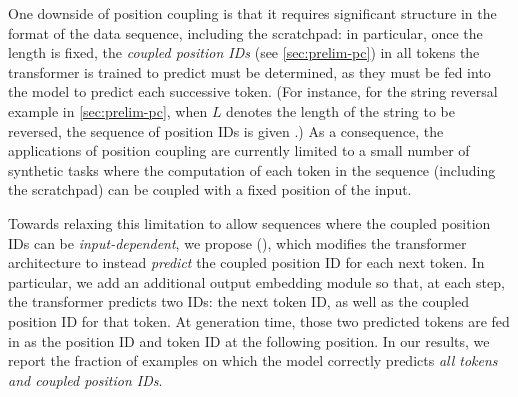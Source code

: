 \documentclass{article}
\newcommand{\arxiv}[1]{\iftoggle{icml}{}{#1}}
\newcommand{\icml}[1]{\iftoggle{icml}{#1}{}}
\begin{document}
One downside of position coupling is that it requires significant structure in the format of the data sequence, including the scratchpad: in particular, once the length is fixed, the \emph{coupled position IDs} (see \cref{sec:prelim-pc}) in all tokens the transformer is trained to predict  must be determined, as they must be fed into the model to predict each successive token. (For instance, for the string reversal example in \cref{sec:prelim-pc}, when $L$ denotes the length of the string to be reversed, the sequence of position IDs is given \arxiv{by \cref{eq:string-reversal-posids}}\icml{as in \cref{sec:prelim-pc}}.) %
As a consequence, the applications of position coupling are currently limited to a small number of synthetic tasks where the computation of each token in the sequence (including the scratchpad) can be coupled with a fixed position of the input.

Towards relaxing this limitation to allow sequences where the coupled position IDs can be \emph{input-dependent}, we propose \emph{\predpc} (\PPC), which modifies the transformer architecture to instead \emph{predict} the coupled position ID for each next token. In particular, we add an additional output embedding module so that, at each step, the transformer predicts two IDs: the next token ID, as well as the coupled position ID for that token. At generation time, those two predicted tokens are fed in as the position ID and token ID at the following position. 
In our results, we report the fraction of examples on which the model correctly predicts \emph{all tokens and coupled position IDs}. %


\arxiv{\paragraph{Experimental goals.} In the experiments discussed below, we aim to: (a) show that \predpc can successfully be applied to improve length generalization on instances where position IDs in the scratchpad must be predicted; and (b) validate our theoretical takeaways emphasizing the importance of \emph{sparsity} \ref{it:ta-sparsity} and \emph{locality}  \ref{it:ta-locality} in controlling length \generalization for instances with a scratchpad. Towards the latter goal, %
we will evaluate the impact of (i) removing position coupling, which as discussed in \cref{sec:theory-pc} corresponds to decreasing locality; or (ii) (partially) removing the scratchpad, which for our scratchpad formats will decrease the sparsity. %
}
\end{document}

